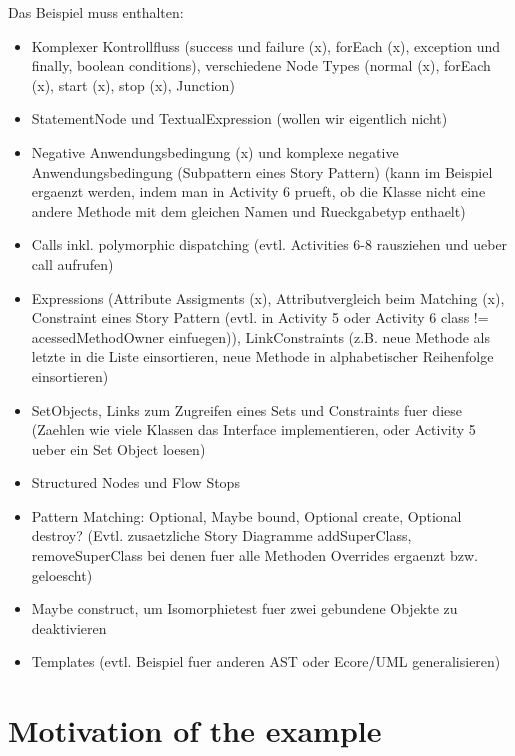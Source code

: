 Das Beispiel muss enthalten:
\begin{itemize}
  \item Komplexer Kontrollfluss (success und failure (x), forEach (x), exception und finally, boolean conditions), verschiedene Node Types (normal (x), forEach (x), start (x), stop (x), Junction)
  \item StatementNode und TextualExpression (wollen wir eigentlich nicht)
  \item Negative Anwendungsbedingung (x) und komplexe negative Anwendungsbedingung (Subpattern eines Story Pattern) (kann im Beispiel ergaenzt werden, indem man in Activity 6 prueft, ob die Klasse nicht eine andere Methode mit dem gleichen Namen und Rueckgabetyp enthaelt) 
  \item Calls inkl. polymorphic dispatching  (evtl. Activities 6-8 rausziehen und ueber call aufrufen)
  \item Expressions (Attribute Assigments (x), Attributvergleich beim Matching (x), Constraint eines Story Pattern (evtl. in Activity 5 oder Activity 6 class != acessedMethodOwner einfuegen)), LinkConstraints (z.B. neue Methode als letzte in die Liste einsortieren, neue Methode in alphabetischer Reihenfolge einsortieren)
  \item SetObjects, Links zum Zugreifen eines Sets und Constraints fuer diese (Zaehlen wie viele Klassen das Interface implementieren, oder Activity 5 ueber ein Set Object loesen)
  \item Structured Nodes und Flow Stops
  \item Pattern Matching: Optional, Maybe bound, Optional create, Optional destroy? (Evtl. zusaetzliche Story Diagramme addSuperClass, removeSuperClass bei denen fuer alle Methoden Overrides ergaenzt bzw. geloescht)
  \item Maybe construct, um Isomorphietest fuer zwei gebundene Objekte zu deaktivieren
  \item Templates (evtl. Beispiel fuer anderen AST oder Ecore/UML generalisieren)
\end{itemize}

\section{Motivation of the example}



